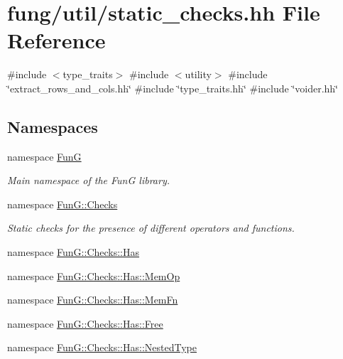 \hypertarget{static__checks_8hh}{\section{fung/util/static\-\_\-checks.hh \-File \-Reference}
\label{static__checks_8hh}
}
{\ttfamily \#include $<$type\-\_\-traits$>$}\*
{\ttfamily \#include $<$utility$>$}\*
{\ttfamily \#include \char`\"{}extract\-\_\-rows\-\_\-and\-\_\-cols.\-hh\char`\"{}}\*
{\ttfamily \#include \char`\"{}type\-\_\-traits.\-hh\char`\"{}}\*
{\ttfamily \#include \char`\"{}voider.\-hh\char`\"{}}\*
\subsection*{\-Namespaces}
\begin{DoxyCompactItemize}
\item 
namespace \hyperlink{namespaceFunG}{\-Fun\-G}
\begin{DoxyCompactList}\small\item\em \-Main namespace of the \-Fun\-G library. \end{DoxyCompactList}\item 
namespace \hyperlink{namespaceFunG_1_1Checks}{\-Fun\-G\-::\-Checks}
\begin{DoxyCompactList}\small\item\em \-Static checks for the presence of different operators and functions. \end{DoxyCompactList}\item 
namespace \hyperlink{namespaceFunG_1_1Checks_1_1Has}{\-Fun\-G\-::\-Checks\-::\-Has}
\item 
namespace \hyperlink{namespaceFunG_1_1Checks_1_1Has_1_1MemOp}{\-Fun\-G\-::\-Checks\-::\-Has\-::\-Mem\-Op}
\item 
namespace \hyperlink{namespaceFunG_1_1Checks_1_1Has_1_1MemFn}{\-Fun\-G\-::\-Checks\-::\-Has\-::\-Mem\-Fn}
\item 
namespace \hyperlink{namespaceFunG_1_1Checks_1_1Has_1_1Free}{\-Fun\-G\-::\-Checks\-::\-Has\-::\-Free}
\item 
namespace \hyperlink{namespaceFunG_1_1Checks_1_1Has_1_1NestedType}{\-Fun\-G\-::\-Checks\-::\-Has\-::\-Nested\-Type}
\end{DoxyCompactItemize}
